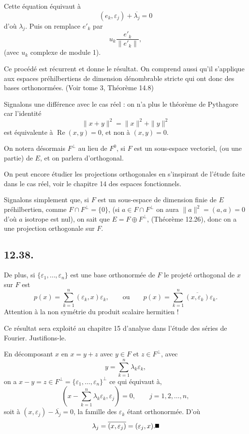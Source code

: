 Cette équation équivaut à
\[
(e_k,\varepsilon_j)+\overline{\lambda_j}=0
\]
d'où $\lambda_j$. Puis on remplace $e'_k$ par
\[
u_k\frac{e'_k}{\|e'_k\|},
\]
(avec $u_k$ complexe de module 1).

Ce procédé est récurrent et donne le résultat. On comprend aussi qu'il s'applique aux espaces préhilbertiens de dimension dénombrable stricte qui ont donc des bases orthonormées. (Voir tome 3, Théorème 14.8) \bookend

Signalons une différence avec le cas réel : on n'a plus le théorème de Pythagore car l'identité
\[
\|x+y\|^2=\|x\|^2+\|y\|^2
\]
est équivalente à $\operatorname{Re}(x,y)=0$, et non à $(x,y)=0$.

On notera désormais $F^\perp$ au lieu de $F^0$, si $F$ est un sous-espace vectoriel, (ou une partie) de $E$, et on parlera d'orthogonal.

On peut encore étudier les projections orthogonales en s'inspirant de l'étude faite dans le cas réel, voir le chapitre 14 des espaces fonctionnels.

Signalons simplement que, si $F$ est un sous-espace de dimension finie de $E$ préhilbertien, comme $F\cap F^\perp=\{0\}$, (si $a\in F\cap F^\perp$ on aura $\|a\|^2=(a,a)=0$ d'où $a$ isotrope est nul), on sait que $E=F\oplus F^\perp$, (Théorème 12.26), donc on a une projection orthogonale sur $F$.

\subsection*{12.38.}
De plus, si $\{\varepsilon_1,\ldots,\varepsilon_n\}$ est une base orthonormée de $F$ le projeté orthogonal de $x$ sur $F$ est
\[
p(x)=\sum_{k=1}^n(\varepsilon_k,x)\varepsilon_k,
\qquad\text{ou}\qquad
p(x)=\sum_{k=1}^n\overline{(x,\varepsilon_k)}\varepsilon_k.
\]
Attention à la non symétrie du produit scalaire hermitien !

Ce résultat sera exploité au chapitre 15 d'analyse dans l'étude des séries de Fourier. Justifions-le.

En décomposant $x$ en $x=y+z$ avec $y\in F$ et $z\in F^\perp$, avec
\[
y=\sum_{k=1}^n\lambda_k\varepsilon_k,
\]
on a $x-y=z\in F^\perp=\{\varepsilon_1,\ldots,\varepsilon_n\}^\perp$ ce qui équivaut à,
\[
\left(x-\sum_{k=1}^n\lambda_k\varepsilon_k,\varepsilon_j\right)=0,
\qquad j=1,2,\ldots,n,
\]
soit à $(x,\varepsilon_j)-\overline{\lambda_j}=0$, la famille des $\varepsilon_k$ étant orthonormée. D'où
\[
\lambda_j=\overline{(x,\varepsilon_j)}=(\varepsilon_j,x). \bookend
\]

